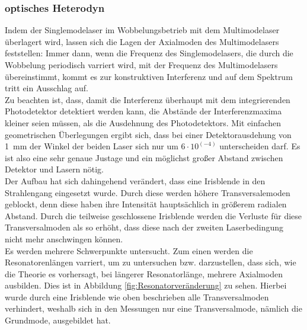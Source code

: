 \documentclass[a4paper,twoside,final]{article}
\begin{document}
\subsubsection{optisches Heterodyn}
Indem der Singlemodelaser im Wobbelungsbetrieb mit dem Multimodelaser überlagert wird, lassen sich die Lagen der Axialmoden des Multimodelasers feststellen: Immer dann, wenn die Frequenz des Singlemodelasers, die durch die Wobbelung periodisch varriert wird, mit der Frequenz des Multimodelasers übereinstimmt, kommt es zur konstruktiven Interferenz und auf dem Spektrum tritt ein Ausschlag auf. \\
Zu beachten ist, dass, damit die Interferenz überhaupt mit dem integrierenden Photodetektor detektiert werden kann, die Abstände der Interferenzmaxima kleiner seien müssen, als die Ausdehnung des Photodetektors. Mit einfachen geometrischen Überlegungen ergibt sich, dass bei einer Detektorausdehung von \SI{1}{\milli\meter} der Winkel der beiden Laser sich nur um $6\cdot 10^(-4)$ unterscheiden darf. Es ist also eine sehr genaue Justage und ein möglichst großer Abstand zwischen Detektor und Lasern nötig. \\
Der Aufbau hat sich dahingehend verändert, dass eine Irisblende in den Strahlengang eingesetzt wurde. Durch diese werden höhere Transversalemoden geblockt, denn diese haben ihre Intensität hauptsächlich in größerem radialen Abstand. Durch die teilweise geschlossene Irisblende werden die Verluste für diese Transversalmoden als so erhöht, dass diese nach der zweiten Laserbedingung nicht mehr anschwingen können. \\
Es werden mehrere Schwerpunkte untersucht. Zum einen werden die Resonatorenlängen varriert, um zu untersuchen bzw. darzustellen, dass sich, wie die Theorie es vorhersagt, bei längerer Resonatorlänge, mehrere Axialmoden ausbilden. Dies ist in Abbildung \ref{fig:Resonatorveränderung} zu sehen. Hierbei wurde durch eine Irisblende wie oben beschrieben alle Transversalmoden verhindert, weshalb sich in den Messungen nur eine Transversalmode, nämlich die Grundmode, ausgebildet hat.
\end{document}
